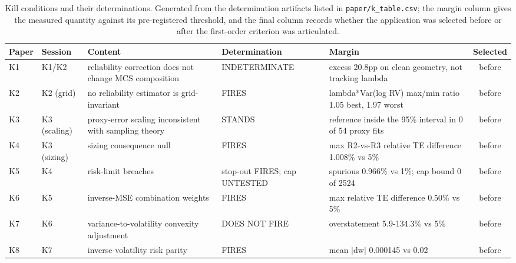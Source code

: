 \begin{table}[!ht]\centering\footnotesize
\setlength{\tabcolsep}{4pt}\renewcommand{\arraystretch}{1.15}
\setlength{\abovetopsep}{6pt}
\caption{Kill conditions and their determinations.\protect\footnotemark{} Generated from the determination artifacts listed in \texttt{paper/k\_table.csv}; the margin column gives the measured quantity against its pre-registered threshold, and the final column records whether the application was selected before or after the first-order criterion was articulated.}\label{tab:kill}
\begin{tabular}{@{}ll>{\raggedright\arraybackslash}p{3.3cm}>{\raggedright\arraybackslash}p{3.0cm}>{\raggedright\arraybackslash}p{4.3cm}c@{}}
\toprule
Paper & Session & Content & Determination & Margin & Selected \\
\midrule
K1 & K1/K2 & reliability correction does not change MCS composition & INDETER\-MINATE & excess 20.8pp on clean geometry, not tracking lambda & before \\  %
K2 & K2 (grid) & no reliability estimator is grid-invariant & FIRES & lambda*Var(log RV) max/min ratio 1.05 best, 1.97 worst & before \\  %
K3 & K3 (scaling) & proxy-error scaling inconsistent with sampling theory & STANDS & reference inside the 95\% interval in 0 of 54 proxy fits & before \\  %
K4 & K3 (sizing) & sizing consequence null & FIRES & max R2-vs-R3 relative TE difference 1.008\% vs 5\% & before \\  %
K5 & K4 & risk-limit breaches & stop-out FIRES; cap UN\-TESTED & spurious 0.966\% vs 1\%; cap bound 0 of 2524 & before \\  %
K6 & K5 & inverse-MSE combination weights & FIRES & max relative TE difference 0.50\% vs 5\% & before \\  %
K7 & K6 & variance-to-volatility convexity adjustment & DOES NOT FIRE & overstatement 5.9-134.3\% vs 5\% & before \\  %
K8 & K7 & inverse-volatility risk parity & FIRES & mean $|$dw$|$ 0.000145 vs 0.02 & before \\  %

\end{tabular}
\end{table}

